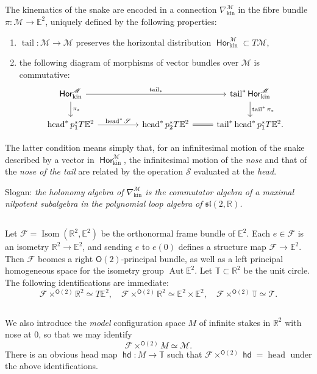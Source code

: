 \documentclass{amsart}
\def\RR{\mathbb{R}}
\def\EE{\mathbb{E}}
\def\TT{\mathbb{T}}
\def\sF{\mathscr{F}}
\def\sT{\mathscr{T}}
\def\sM{\mathscr{M}}
\def\sS{\mathscr{S}}
\DeclareMathOperator{\Isom}{\mathrm{Isom}}
\DeclareMathOperator{\Aut}{\mathrm{Aut}}
\def\O{\mathsf{O}}
\DeclareMathOperator{\head}{{\mathsf{hd}}}
\DeclareMathOperator{\stail}{{\mathrm{tail}}}
\DeclareMathOperator{\shead}{{\mathrm{head}}}
\DeclareMathOperator{\Hor}{\mathsf{Hor}}
\def\kin{\mathrm{kin}}
\theoremstyle{definition}
\begin{document}
\subsection{}
The kinematics of the snake are encoded in a connection $\nabla^\sM_\kin$
in the fibre bundle $\pi : \sM \to \EE^2$, uniquely defined by the following properties:
\begin{enumerate}
        \item $\stail : \sM \to \sM$ preserves the horizontal distribution $\Hor_\kin^\sM \subset T\sM$,
        \item the following diagram of morphisms of vector bundles over $\sM$ is commutative:
                $$\begin{tikzcd}
                        \Hor_\kin^\sM \arrow[rrr,"\stail_*"] \arrow[d,"\pi_*"] & & & \stail^*\Hor^\sM_\kin 
                                                                               \arrow[d,"\stail^*\pi_*"] \\
                        \shead^* p_1^* T\EE^2 \arrow[rr,"\shead^*\sS"] & & \shead^* p_2^* T\EE^2
                        \arrow[r,equal] & \stail^*\shead^*p_1^*T\EE^2.
                \end{tikzcd}$$
\end{enumerate}
The latter condition means simply that, for an infinitesimal motion
of the snake described by a vector in $\Hor^\sM_\kin$, the infinitesimal
motion of the \emph{nose} and that of the \emph{nose of the tail} are
related by the operation $\sS$ evaluated at the \emph{head}.

Slogan: \emph{the holonomy algebra of $\nabla^\sM_\kin$
        is the commutator algebra of a maximal nilpotent subalgebra
in the polynomial loop algebra of $\mathfrak{sl}(2,\RR)$.}

\subsection{}
Let $\sF = \Isom(\RR^2,\EE^2)$ be the orthonormal frame bundle of $\EE^2$.
Each $e \in \sF$ is an isometry $\RR^2 \to \EE^2$, and sending $e$ to $e(0)$
defines a structure map $\sF \to \EE^2$. Then $\sF$ beomes a right $\O(2)$-principal bundle,
as well as a left principal homogeneous space for the isometry group $\Aut\EE^2$.
Let $\TT \subset \RR^2$ be the unit circle. The following identifications are immediate:
$$
 \sF \times^{\O(2)} \RR^2 \simeq T\EE^2,\quad
 \sF \times^{\O(2)} \RR^2 \simeq \EE^2 \times \EE^2,\quad
 \sF \times^{\O(2)} \TT \simeq \sT.
$$
\subsection{}
We also introduce the \emph{model} configuration space $M$ of infinite stakes in $\RR^2$ with nose at $0$,
so that we may identify
$$
 \sF \times^{\O(2)} M \simeq \sM.
$$
There is an obvious head map $\head:M \to \TT$ such that
$\sF \times^{\O(2)}\head = \shead$ under the above identifications.
\end{document}

